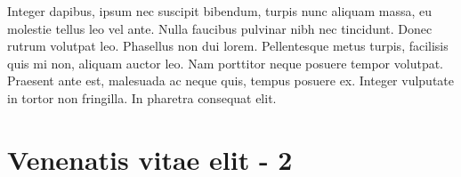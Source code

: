 Integer dapibus, ipsum nec suscipit bibendum, turpis nunc aliquam massa, eu molestie tellus leo vel ante. Nulla faucibus pulvinar nibh nec tincidunt. Donec rutrum volutpat leo. Phasellus non dui lorem. Pellentesque metus turpis, facilisis quis mi non, aliquam auctor leo. Nam porttitor neque posuere tempor volutpat. Praesent ante est, malesuada ac neque quis, tempus posuere ex. Integer vulputate in tortor non fringilla. In pharetra consequat elit.

\section{Venenatis vitae elit - 2}
